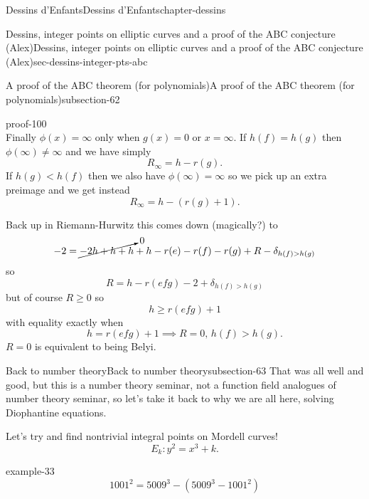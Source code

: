 \documentclass[oneside,10pt,]{book}
\numberwithin{equation}{section}
\newcommand{\lt}{<}
\newcommand{\gt}{>}
\begin{document}
\begin{chapterptx}{Dessins d'Enfants}{}{Dessins d'Enfants}{}{}{chapter-dessins}
\begin{sectionptx}{Dessins, integer points on elliptic curves and a proof of the ABC conjecture (Alex)}{}{Dessins, integer points on elliptic curves and a proof of the ABC conjecture (Alex)}{}{}{sec-dessins-integer-pts-abc}
\begin{subsectionptx}{A proof of the ABC theorem (for polynomials)}{}{A proof of the ABC theorem (for polynomials)}{}{}{subsection-62}
\begin{proofptx}{}{proof-100}
\begin{equation*}
\end{equation*}
Finally \(\phi(x) = \infty\) only when \(g(x) = 0\) or \(x = \infty\). If \(h(f) = h(g)\) then \(\phi(\infty) \ne \infty\) and we have simply%
\begin{equation*}
R_\infty = h - r(g)\text{.}
\end{equation*}
If \(h(g) \lt h(f)\) then we also have \(\phi(\infty) = \infty\) so we pick up an extra preimage and we get instead%
\begin{equation*}
R_\infty = h - (r(g) + 1)\text{.}
\end{equation*}
%
\par
\hypertarget{p-704}{}%
Back up in Riemann-Hurwitz this comes down (magically?) to%
\begin{equation*}
-2 = \cancelto{0}{-2 h + h + h} + h - r(e) -r(f) - r(g) + R - \delta_{h(f) \gt h(g)}
\end{equation*}
so%
\begin{equation*}
R = h - r(efg) - 2 + \delta_{h(f) \gt h(g)}
\end{equation*}
but of course \(R \ge 0\) so%
\begin{equation*}
h \ge r(efg) + 1
\end{equation*}
with equality exactly when%
\begin{equation*}
h = r(efg) + 1 \implies R = 0,\, h(f) \gt h(g)\text{.}
\end{equation*}
\(R= 0\) is equivalent to being Belyi.%
\end{proofptx}
\end{subsectionptx}
%
%
\typeout{************************************************}
\typeout{************************************************}
%
\begin{subsectionptx}{Back to number theory}{}{Back to number theory}{}{}{subsection-63}
\hypertarget{p-705}{}%
That was all well and good, but this is a number theory seminar, not a function field analogues of number theory seminar, so let's take it back to why we are all here, solving Diophantine equations.%
\par
\hypertarget{p-706}{}%
Let's try and find nontrivial integral points on Mordell curves!%
\begin{equation*}
E_k\colon y^2 = x^3 + k\text{.}
\end{equation*}
%
\begin{example}{}{example-33}%
\hypertarget{p-707}{}%
%
\begin{equation*}
1001^2 = 5009^3 - (5009^3 - 1001^2)

\end{equation*}
\end{example}
\end{subsectionptx}
\end{sectionptx}
\end{chapterptx}
\end{document}
